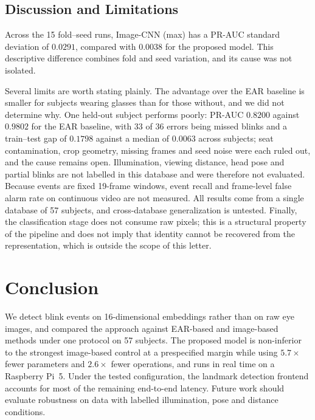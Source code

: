 \documentclass{IEEE_lsens}
\begin{document}
\subsection{Discussion and Limitations}
Across the 15 fold--seed runs, Image-CNN (max) has a PR-AUC standard
deviation of $0.0291$, compared with $0.0038$ for the proposed model.
This descriptive difference combines fold and seed variation, and its
cause was not isolated.

Several limits are worth stating plainly. The advantage over the EAR
baseline is smaller for subjects wearing glasses than for those without,
and we did not determine why. One held-out subject performs poorly: PR-AUC
$0.8200$ against $0.9802$ for the EAR baseline, with 33 of 36 errors
being missed blinks and a train--test gap of $0.1798$ against a median
of $0.0063$ across subjects; seat contamination, crop geometry, missing
frames and seed noise were each ruled out, and the cause remains open.
Illumination, viewing distance, head pose and partial blinks are not
labelled in this database and were therefore not evaluated. Because
events are fixed 19-frame windows, event recall and frame-level false
alarm rate on continuous video are not measured. All results come from a
single database of 57 subjects, and cross-database generalization is
untested. Finally, the classification stage does not consume raw pixels;
this is a structural property of the pipeline and does not imply that
identity cannot be recovered from the representation, which is outside
the scope of this letter.

\section{Conclusion}
We detect blink events on 16-dimensional embeddings rather than on raw
eye images, and compared the approach against EAR-based and image-based
methods under one protocol on 57 subjects. The proposed model is
non-inferior to the strongest image-based control at a prespecified
margin while using $5.7\times$ fewer parameters and $2.6\times$ fewer
operations, and runs in real time on a Raspberry Pi~5. Under the tested
configuration, the landmark detection frontend accounts for most of the
remaining end-to-end latency.
Future work should evaluate robustness on data with labelled
illumination, pose and distance conditions.
\end{document}
